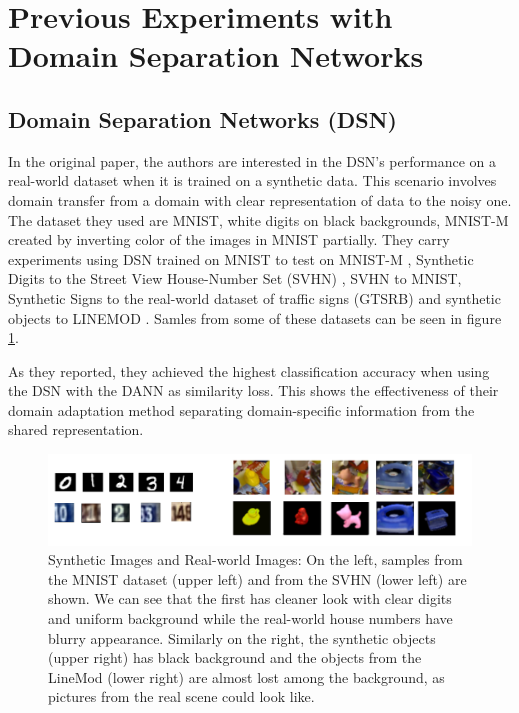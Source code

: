 \section{Previous Experiments with Domain Separation Networks} 
\subsection*{Domain Separation Networks (DSN)} In the original paper, the authors are interested in the DSN's performance on a real-world dataset when it is trained on a synthetic data. This scenario involves domain transfer from a domain with clear representation of data to the noisy one. The dataset they used are MNIST, white digits on black backgrounds, MNIST-M created by inverting color of the images in MNIST partially. They carry experiments using DSN trained on MNIST \cite{mnist} to test on MNIST-M \cite{mnist-m}, Synthetic Digits to the Street View House-Number Set (SVHN) \cite{svhn}, SVHN to MNIST, Synthetic Signs to the real-world dataset of traffic signs (GTSRB) \cite{gtsrb} and synthetic objects to LINEMOD \cite{linemod}. Samles from some of these datasets can be seen in figure \ref{fig:datasets}. 

As they reported, they achieved the highest classification accuracy when using the DSN with the DANN as similarity loss. This shows the effectiveness of their domain adaptation method separating domain-specific information from the shared representation.

\begin{figure}[tbh]
  \centering
    \includegraphics[width=\textwidth]{abbildungen/datasets.png}
  \caption{Synthetic Images and Real-world Images: On the left, samples from the MNIST dataset (upper left) and from the SVHN (lower left) are shown. We can see that the first has cleaner look with clear digits and uniform background while the real-world house numbers have blurry appearance. Similarly on the right, the synthetic objects (upper right) has black background and the objects from the LineMod (lower right) are almost lost among the background, as pictures from the real scene could look like.}
  \label{fig:datasets}
\end{figure}

